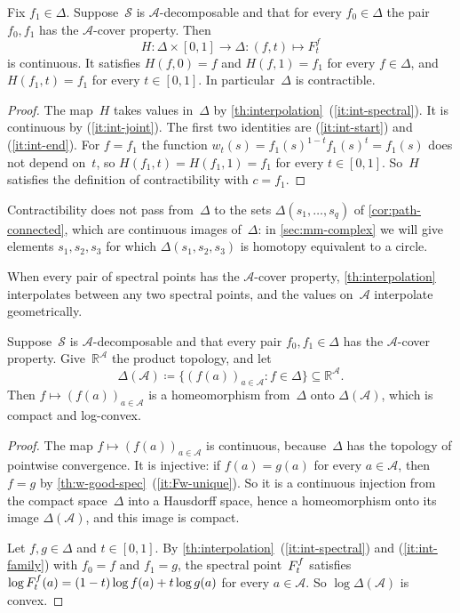 \documentclass[11pt,letterpaper]{article}
\newcommand{\RR}{\mathbb{R}}
\begin{document}
\begin{corollary}\label{cor:contractible}
Fix $f_1 \in \Delta$. Suppose~$\mathcal{S}$ is $\mathcal{A}$-decomposable and that for every $f_0 \in \Delta$ the pair $f_0, f_1$ has the $\mathcal{A}$-cover property. Then
\[
H : \Delta \times [0,1] \to \Delta : (f,t) \mapsto F^f_t
\]
is continuous. It satisfies $H(f,0) = f$ and $H(f,1) = f_1$ for every $f \in \Delta$, and $H(f_1,t) = f_1$ for every $t \in [0,1]$. In particular~$\Delta$ is contractible.
\end{corollary}
\begin{proof}
The map~$H$ takes values in~$\Delta$ by \cref{th:interpolation}~(\ref{it:int-spectral}). It is continuous by (\ref{it:int-joint}). The first two identities are (\ref{it:int-start}) and (\ref{it:int-end}). For $f = f_1$ the function $w_t(s) = f_1(s)^{1-t} f_1(s)^t = f_1(s)$ does not depend on~$t$, so $H(f_1,t) = H(f_1,1) = f_1$ for every $t \in [0,1]$. So~$H$ satisfies the definition of contractibility with $c = f_1$.
\end{proof}

Contractibility does not pass from~$\Delta$ to the sets $\Delta(s_1, \ldots, s_q)$ of \cref{cor:path-connected}, which are continuous images of~$\Delta$: in \cref{sec:mm-complex} we will give elements $s_1, s_2, s_3$ for which $\Delta(s_1, s_2, s_3)$ is homotopy equivalent to a circle.

When every pair of spectral points has the $\mathcal{A}$-cover property, \cref{th:interpolation} interpolates between any two spectral points, and the values on~$\mathcal{A}$ interpolate geometrically.
\begin{corollary}\label{cor:convex}
Suppose~$\mathcal{S}$ is $\mathcal{A}$-decomposable and that every pair $f_0, f_1 \in \Delta$ has the $\mathcal{A}$-cover property. Give~$\RR^{\mathcal{A}}$ the product topology, and let
\[
\Delta(\mathcal{A}) \coloneqq \{ (f(a))_{a \in \mathcal{A}} : f \in \Delta \} \subseteq \RR^{\mathcal{A}}.
\]
Then $f \mapsto (f(a))_{a \in \mathcal{A}}$ is a homeomorphism from~$\Delta$ onto $\Delta(\mathcal{A})$, which is compact and log-convex.
\end{corollary}
\begin{proof}
The map $f \mapsto (f(a))_{a \in \mathcal{A}}$ is continuous, because~$\Delta$ has the topology of pointwise convergence. It is injective: if $f(a) = g(a)$ for every $a \in \mathcal{A}$, then $f = g$ by \cref{th:w-good-spec}~(\ref{it:Fw-unique}). So it is a continuous injection from the compact space~$\Delta$ into a Hausdorff space, hence a homeomorphism onto its image $\Delta(\mathcal{A})$, and this image is compact.

Let $f, g \in \Delta$ and $t \in [0,1]$. By \cref{th:interpolation}~(\ref{it:int-spectral}) and (\ref{it:int-family}) with $f_0 = f$ and $f_1 = g$, the spectral point~$F^{\smash[t]{f}}_t$ satisfies $\log F^{\smash[t]{f}}_t(a) = (1-t)\log f(a) + t\log g(a)$ for every $a \in \mathcal{A}$. So $\log \Delta(\mathcal{A})$ is convex.
\end{proof}
\end{document}
